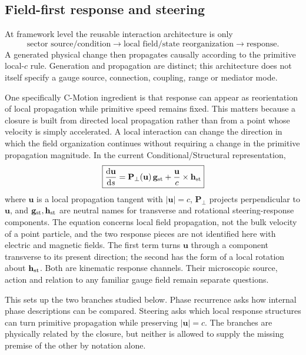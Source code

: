 \documentclass[11pt]{article}
\theoremstyle{definition}
\newcommand{\dd}{\mathrm{d}}
\begin{document}
\subsection{Field-first response and steering}

At framework level the reusable interaction architecture is only
\begin{equation}
 \text{sector source/condition}
 \longrightarrow
 \text{local field/state reorganization}
 \longrightarrow
 \text{response}.
 \label{eq:source_response_architecture}
\end{equation}
A generated physical change then propagates causally according to the primitive local-$c$ rule.  Generation and propagation are distinct; this architecture does not itself specify a gauge source, connection, coupling, range or mediator mode.

One specifically C-Motion ingredient is that response can appear as reorientation of local propagation while primitive speed remains fixed.  This matters because a closure is built from directed local propagation rather than from a point whose velocity is simply accelerated.  A local interaction can change the direction in which the field organization continues without requiring a change in the primitive propagation magnitude.  In the current Conditional/Structural representation,
\begin{equation}
 \boxed{
 \frac{\dd\mathbf u}{\dd s}
 =
 \mathbf P_\perp(\mathbf u)\,\mathbf g_{\rm st}
 +\frac{\mathbf u}{c}\times\mathbf h_{\rm st}}
 \label{eq:projected_steering}
\end{equation}
where $\mathbf u$ is a local propagation tangent with $|\mathbf u|=c$, $\mathbf P_\perp$ projects perpendicular to $\mathbf u$, and $\mathbf g_{\rm st},\mathbf h_{\rm st}$ are neutral names for transverse and rotational steering-response components.  The equation concerns local field propagation, not the bulk velocity of a point particle, and the two response pieces are not identified here with electric and magnetic fields.  The first term turns $\mathbf u$ through a component transverse to its present direction; the second has the form of a local rotation about $\mathbf h_{\rm st}$.  Both are kinematic response channels.  Their microscopic source, action and relation to any familiar gauge field remain separate questions.

This sets up the two branches studied below.  Phase recurrence asks how internal phase descriptions can be compared.  Steering asks which local response structures can turn primitive propagation while preserving $|\mathbf u|=c$.  The branches are physically related by the closure, but neither is allowed to supply the missing premise of the other by notation alone.
\end{document}
